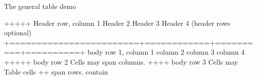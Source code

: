 \documentclass[letterpaper,12pt,english]{sphinxmanual}
\begin{document}
\begin{sphinxVerbatim}[commandchars=\\\{\}]
 
  The general table demo

        +\PYGZhy{}\PYGZhy{}\PYGZhy{}\PYGZhy{}\PYGZhy{}\PYGZhy{}\PYGZhy{}\PYGZhy{}\PYGZhy{}\PYGZhy{}\PYGZhy{}\PYGZhy{}\PYGZhy{}\PYGZhy{}\PYGZhy{}\PYGZhy{}\PYGZhy{}\PYGZhy{}\PYGZhy{}\PYGZhy{}\PYGZhy{}\PYGZhy{}\PYGZhy{}\PYGZhy{}+\PYGZhy{}\PYGZhy{}\PYGZhy{}\PYGZhy{}\PYGZhy{}\PYGZhy{}\PYGZhy{}\PYGZhy{}\PYGZhy{}\PYGZhy{}\PYGZhy{}\PYGZhy{}+\PYGZhy{}\PYGZhy{}\PYGZhy{}\PYGZhy{}\PYGZhy{}\PYGZhy{}\PYGZhy{}\PYGZhy{}\PYGZhy{}\PYGZhy{}+\PYGZhy{}\PYGZhy{}\PYGZhy{}\PYGZhy{}\PYGZhy{}\PYGZhy{}\PYGZhy{}\PYGZhy{}\PYGZhy{}\PYGZhy{}+
         Header row, column 1   \textbar{} Header 2   \textbar{} Header 3 \textbar{} Header 4 \textbar{}
         (header rows optional) \textbar{}            \textbar{}          \textbar{}          \textbar{}
        +========================+============+==========+==========+
         body row 1, column 1   \textbar{} column 2   \textbar{} column 3 \textbar{} column 4 \textbar{}
        +\PYGZhy{}\PYGZhy{}\PYGZhy{}\PYGZhy{}\PYGZhy{}\PYGZhy{}\PYGZhy{}\PYGZhy{}\PYGZhy{}\PYGZhy{}\PYGZhy{}\PYGZhy{}\PYGZhy{}\PYGZhy{}\PYGZhy{}\PYGZhy{}\PYGZhy{}\PYGZhy{}\PYGZhy{}\PYGZhy{}\PYGZhy{}\PYGZhy{}\PYGZhy{}\PYGZhy{}+\PYGZhy{}\PYGZhy{}\PYGZhy{}\PYGZhy{}\PYGZhy{}\PYGZhy{}\PYGZhy{}\PYGZhy{}\PYGZhy{}\PYGZhy{}\PYGZhy{}\PYGZhy{}+\PYGZhy{}\PYGZhy{}\PYGZhy{}\PYGZhy{}\PYGZhy{}\PYGZhy{}\PYGZhy{}\PYGZhy{}\PYGZhy{}\PYGZhy{}+\PYGZhy{}\PYGZhy{}\PYGZhy{}\PYGZhy{}\PYGZhy{}\PYGZhy{}\PYGZhy{}\PYGZhy{}\PYGZhy{}\PYGZhy{}+
         body row 2             \textbar{} Cells may span columns.          \textbar{}
        +\PYGZhy{}\PYGZhy{}\PYGZhy{}\PYGZhy{}\PYGZhy{}\PYGZhy{}\PYGZhy{}\PYGZhy{}\PYGZhy{}\PYGZhy{}\PYGZhy{}\PYGZhy{}\PYGZhy{}\PYGZhy{}\PYGZhy{}\PYGZhy{}\PYGZhy{}\PYGZhy{}\PYGZhy{}\PYGZhy{}\PYGZhy{}\PYGZhy{}\PYGZhy{}\PYGZhy{}+\PYGZhy{}\PYGZhy{}\PYGZhy{}\PYGZhy{}\PYGZhy{}\PYGZhy{}\PYGZhy{}\PYGZhy{}\PYGZhy{}\PYGZhy{}\PYGZhy{}\PYGZhy{}+\PYGZhy{}\PYGZhy{}\PYGZhy{}\PYGZhy{}\PYGZhy{}\PYGZhy{}\PYGZhy{}\PYGZhy{}\PYGZhy{}\PYGZhy{}\PYGZhy{}\PYGZhy{}\PYGZhy{}\PYGZhy{}\PYGZhy{}\PYGZhy{}\PYGZhy{}\PYGZhy{}\PYGZhy{}\PYGZhy{}\PYGZhy{}+
         body row 3             \textbar{} Cells may  \textbar{} \PYGZhy{} Table cells       \textbar{}
        +\PYGZhy{}\PYGZhy{}\PYGZhy{}\PYGZhy{}\PYGZhy{}\PYGZhy{}\PYGZhy{}\PYGZhy{}\PYGZhy{}\PYGZhy{}\PYGZhy{}\PYGZhy{}\PYGZhy{}\PYGZhy{}\PYGZhy{}\PYGZhy{}\PYGZhy{}\PYGZhy{}\PYGZhy{}\PYGZhy{}\PYGZhy{}\PYGZhy{}\PYGZhy{}\PYGZhy{}+ span rows. \textbar{} \PYGZhy{} contain           \textbar{}

\end{sphinxVerbatim}
\end{document}
